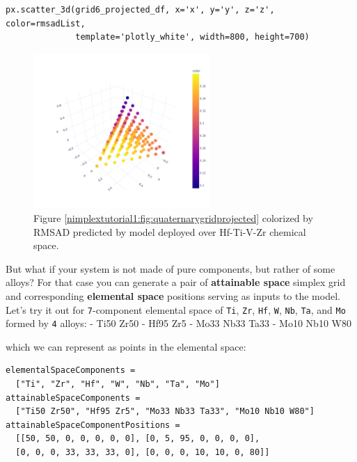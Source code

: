 \begin{verbatim}
px.scatter_3d(grid6_projected_df, x='x', y='y', z='z', color=rmsadList,
              template='plotly_white', width=800, height=700)
\end{verbatim}

\begin{figure}[H]
    \centering
    \includegraphics[width=0.6\textwidth]{nimplexTutorial1/01.QuickStart_37_0.pdf}
    \caption{Figure \ref{nimplextutorial1:fig:quaternarygridprojected} colorized by RMSAD predicted by model \cite{Tandoc2023MiningAlloys} deployed over Hf-Ti-V-Zr chemical space.}
    \label{nimplextutorial1:fig:quaternarygridcolored}
\end{figure}

But what if your system is not made of pure components, but rather of
some alloys? For that case you can generate a pair of \textbf{attainable
space} simplex grid and corresponding \textbf{elemental space} positions
serving as inputs to the model. Let's try it out for
\texttt{7}-component elemental space of
\texttt{Ti}, \texttt{Zr},
\texttt{Hf}, \texttt{W},
\texttt{Nb}, \texttt{Ta}, and
\texttt{Mo} formed by \texttt{4}
alloys: - Ti50 Zr50 - Hf95 Zr5 - Mo33 Nb33 Ta33 - Mo10 Nb10 W80

which we can represent as points in the elemental space:

\begin{verbatim}
elementalSpaceComponents = 
  ["Ti", "Zr", "Hf", "W", "Nb", "Ta", "Mo"]
attainableSpaceComponents = 
  ["Ti50 Zr50", "Hf95 Zr5", "Mo33 Nb33 Ta33", "Mo10 Nb10 W80"]
attainableSpaceComponentPositions = 
  [[50, 50, 0, 0, 0, 0, 0], [0, 5, 95, 0, 0, 0, 0], 
  [0, 0, 0, 33, 33, 33, 0], [0, 0, 0, 10, 10, 0, 80]]
\end{verbatim}

